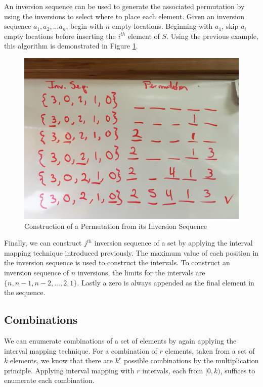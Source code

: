 An inversion sequence can be used to generate the associated permutation by using the inversions to select where to place each element. Given an inversion sequence $a_1, a_2, ... a_n$, begin with $n$ empty locations. Beginning with $a_1$, skip $a_i$ empty locations before inserting the $i^{th}$ element of $S$. Using the previous example, this algorithm is demonstrated in Figure \ref{fig:inversion_sequence}.

\begin{figure}[t]
\centering
\centerline{\includegraphics[origin=c,width=12cm]{../figures/inv-seq.jpg}}
\caption{Construction of a Permutation from its Inversion Sequence}
\label{fig:inversion_sequence}
\end{figure}

Finally, we can construct $j^{th}$ inversion sequence of a set by applying the interval mapping technique introduced previously. The maximum value of each position in the inversion sequence is used to construct the intervals. To construct an inversion sequence of $n$ inversions, the limits for the intervals are $\{n, n - 1, n - 2, ..., 2, 1\}$. Lastly a zero is always appended as the final element in the sequence.

\subsection{Combinations}

We can enumerate combinations of a set of elements by again applying the interval mapping technique. For a combination of $r$ elements, taken from a set of $k$ elements, we know that there are $k^r$ possible combinations by the multiplication principle. Applying interval mapping with $r$ intervals, each from $[0, k)$, suffices to enumerate each combination.


